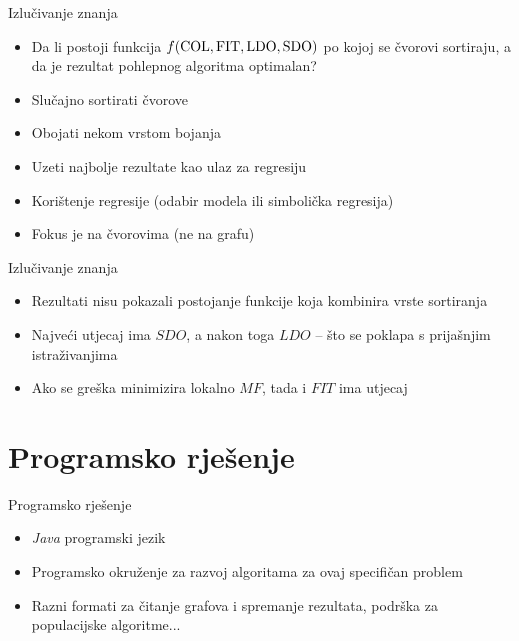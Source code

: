 \documentclass[utf8]{beamer}
\begin{document}
\begin{frame}{Izlučivanje znanja}
	\begin{itemize}
		\item Da li postoji funkcija $f(\textup{COL}, \textup{FIT}, \textup{LDO}, \textup{SDO})$ po kojoj se čvorovi sortiraju, a da je rezultat pohlepnog algoritma optimalan?
		\pause
		\item Slučajno sortirati čvorove
		\pause
		\item Obojati nekom vrstom bojanja
		\pause
		\item Uzeti najbolje rezultate kao ulaz za regresiju
		\pause
		\item Korištenje regresije (odabir modela ili simbolička regresija)
		\pause
		\item Fokus je na čvorovima (ne na grafu)
	\end{itemize}
\end{frame}

\begin{frame}{Izlučivanje znanja}
	\begin{itemize}
		\item Rezultati nisu pokazali postojanje funkcije koja kombinira vrste sortiranja
		\item Najveći utjecaj ima $SDO$, a nakon toga $LDO$ -- što se poklapa s prijašnjim istraživanjima
		\item Ako se greška minimizira lokalno $MF$, tada i $FIT$ ima utjecaj
	\end{itemize}
\end{frame}



\section{Programsko rješenje}
\begin{frame}{Programsko rješenje}
	\begin{itemize}
		\item \emph{Java} programski jezik
		\pause
		\item Programsko okruženje za razvoj algoritama za ovaj specifičan problem
		\pause
		\item Razni formati za čitanje grafova i spremanje rezultata, podrška za populacijske algoritme...
	\end{itemize}
\end{frame}
\end{document}
